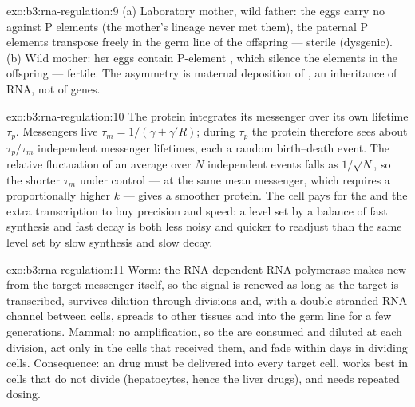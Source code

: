 \begin{solution}{exo:b3:rna-regulation:9}
(a) Laboratory mother, wild father: the eggs carry no  against P
elements (the mother's lineage never met them), the paternal P elements
transpose freely in the germ line of the offspring --- sterile
(dysgenic). (b) Wild mother: her eggs contain P-element , which
silence the elements in the offspring --- fertile. The asymmetry is
maternal deposition of , an inheritance of RNA, not of genes.
\end{solution}

\begin{solution}{exo:b3:rna-regulation:10}
The protein integrates its messenger over its own lifetime $\tau_{p}$.
Messengers live $\tau_{m} = 1/(\gamma + \gamma' R)$; during $\tau_{p}$
the protein therefore sees about $\tau_{p}/\tau_{m}$ independent
messenger lifetimes, each a random birth--death event. The relative
fluctuation of an average over $N$ independent events falls as
$1/\sqrt{N}$, so the shorter $\tau_{m}$ under  control --- at the
same mean messenger, which requires a proportionally higher $k$ ---
gives a smoother protein. The cell pays for the  and the extra
transcription to buy precision and speed: a level set by a balance of
fast synthesis and fast decay is both less noisy and quicker to
readjust than the same level set by slow synthesis and slow decay.
\end{solution}

\begin{solution}{exo:b3:rna-regulation:11}
Worm: the RNA-dependent RNA polymerase makes new  from the target
messenger itself, so the signal is renewed as long as the target is
transcribed, survives dilution through divisions and, with a
double-stranded-RNA channel between cells, spreads to other tissues and
into the germ line for a few generations. Mammal: no amplification, so
the  are consumed and diluted at each division, act only in the
cells that received them, and fade within days in dividing cells.
Consequence: an  drug must be delivered into every target cell,
works best in cells that do not divide (hepatocytes, hence the liver
drugs), and needs repeated dosing.
\end{solution}

